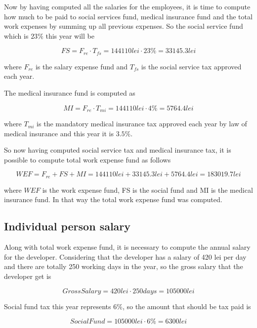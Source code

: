 \documentclass[12pt,a4paper]{report}
\begin{document}
Now by having computed all the salaries for the employees, it is time to compute how much to be paid to social services fund, medical insurance fund and the total work expenses by summing up all previous expenses. So the social service fund which is $23\%$ this year will be 

\begin{equation}
 FS = F_{re} \cdot T_{fs} = 144110 lei \cdot 23 \% = 33145.3 lei 	
\end{equation}

where $F_{re}$ is the salary expense fund and $T_{fs}$ is the social service tax approved each year.

The medical insurance fund is computed as

\begin{equation}
 MI = F_{re} \cdot T_{mi} = 144110 lei \cdot 4 \% = 5764.4 lei
\end{equation}

where $T_{mi}$ is the mandatory medical insurance tax approved each year by law of medical insurance and this year it is $3.5\%$. 

So now having computed social service tax and medical insurance tax, it is possible to compute total work expense fund as follows

\begin{equation}
 WEF = F_{re} + FS + MI = 144110 lei + 33145.3 lei + 5764.4 lei = 183019.7 lei
\end{equation}

where $WEF$ is the work expense fund, FS is the social fund and MI is the medical insurance fund. In that way the total work expense fund was computed. 

\subsection{Individual person salary}
Along with total work expense fund, it is necessary to compute the annual salary for the developer. Considering that the developer has a salary of 420 lei per day and there are totally 250 working days in the year, so the gross salary that the developer get is

\begin{equation}
 Gross Salary = 420 lei \cdot 250 days = 105000 lei
\end{equation}

Social fund tax this year represents $6\%$, so the amount that should be tax paid is

\begin{equation}
 Social Fund = 105000 lei \cdot 6\% = 6300 lei
\end{equation}
\end{document}
